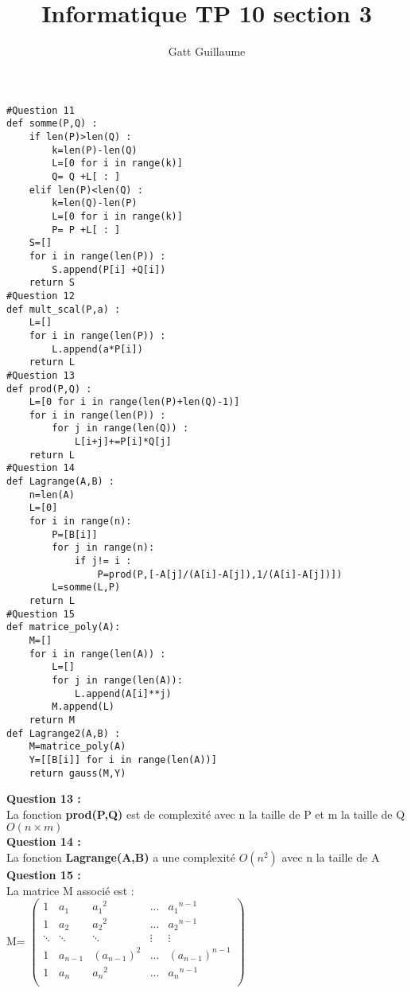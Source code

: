 \documentclass{article}
\begin{document}
\title{Informatique TP 10 section 3}
\date{}
\author{Gatt Guillaume}
\maketitle
	\renewcommand{\thesection}{\Roman{section}}
	\setlength{\parindent}{1.5cm}
\lstset{language=Python}
\begin{lstlisting}
#Question 11 
def somme(P,Q) :
    if len(P)>len(Q) :
        k=len(P)-len(Q)
        L=[0 for i in range(k)]
        Q= Q +L[ : ]
    elif len(P)<len(Q) :
        k=len(Q)-len(P)
        L=[0 for i in range(k)]
        P= P +L[ : ]
    S=[]
    for i in range(len(P)) :
        S.append(P[i] +Q[i])
    return S
#Question 12
def mult_scal(P,a) :
    L=[]
    for i in range(len(P)) :
        L.append(a*P[i])
    return L
#Question 13
def prod(P,Q) :
    L=[0 for i in range(len(P)+len(Q)-1)]
    for i in range(len(P)) :
        for j in range(len(Q)) :
            L[i+j]+=P[i]*Q[j]
    return L
#Question 14
def Lagrange(A,B) :
    n=len(A)
    L=[0]
    for i in range(n):
        P=[B[i]]
        for j in range(n):
            if j!= i :
                P=prod(P,[-A[j]/(A[i]-A[j]),1/(A[i]-A[j])])
        L=somme(L,P)
    return L
#Question 15
def matrice_poly(A):
    M=[]
    for i in range(len(A)) :
        L=[]
        for j in range(len(A)):
            L.append(A[i]**j)
        M.append(L)
    return M
def Lagrange2(A,B) :
    M=matrice_poly(A)
    Y=[[B[i]] for i in range(len(A))]
    return gauss(M,Y)
\end{lstlisting}
{\bf Question 13 :} \\ 
La fonction {\bf prod(P,Q)} est de complexité avec n la taille de P et m la taille de Q $O(n \times m)$ \\ 
{\bf Question 14 :} \\ 
La fonction {\bf Lagrange(A,B)} a une complexité $O(n^2)$ avec n la taille de A \\ 
{\bf Question 15 :} \\ 
La matrice M associé est : \\ 
M=
$\begin{pmatrix}
1 & a_1 & {a_1}^2 &... & {a_1}^{n-1} \\
1 & a_2 & {a_2}^2 & ... & {a_2}^{n-1} \\
\ddots & \ddots &\ddots & \vdots &\vdots\\ 
1 & a_{n-1} & (a_{n-1})^2 & ...& ({a_{n-1}})^{n-1}\\
1 & a_n & {a_n}^2 & ... &{a_n}^{n-1} \\
\end{pmatrix}
$
\end{document}
